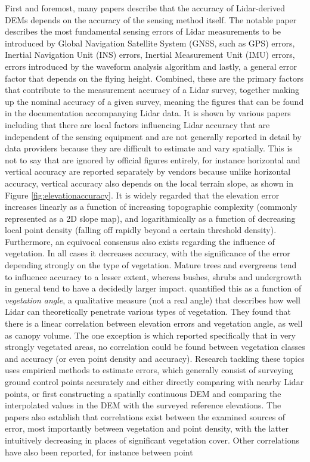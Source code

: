First and foremost, many papers describe that the accuracy of Lidar-derived DEMs depends on the accuracy of the sensing method itself. The notable paper \cite{hodgson_breshanan_2004} describes the most fundamental sensing errors of Lidar measurements to be introduced by Global Navigation Satellite System (GNSS, such as GPS) errors, Inertial Navigation Unit (INS) errors, Inertial Measurement Unit (IMU) errors, errors introduced by the waveform analysis algorithm and lastly, a general error factor that depends on the flying height. Combined, these are the primary factors that contribute to the measurement accuracy of a Lidar survey, together making up the nominal accuracy of a given survey, meaning the figures that can be found in the documentation accompanying Lidar data. It is shown by various papers including \cite{hodgson_breshanan_2004, su_bork_2006, kraus_etal_2006, raber_etal_2007, peng_shih_2006, chow_hodgson_2009, aguilar_etal_2005, aguilar_etal_2010, guo_etal_2010} that there are local factors influencing Lidar accuracy that are independent of the sensing equipment and are not generally reported in detail by data providers because they are difficult to estimate and vary spatially. This is not to say that are ignored by official figures entirely, for instance horizontal and vertical accuracy are reported separately by vendors because unlike horizontal accuracy, vertical accuracy also depends on the local terrain slope, as shown in Figure \ref{fig:elevationaccuracy}. It is widely regarded that the elevation error increases linearly as a function of increasing topographic complexity (commonly represented as a 2D slope map), and logarithmically as a function of decreasing local point density (falling off rapidly beyond a certain threshold density). Furthermore, an equivocal consensus also exists regarding the influence of vegetation. In all cases it decreases accuracy, with the significance of the error depending strongly on the type of vegetation. Mature trees and evergreens tend to influence accuracy to a lesser extent, whereas bushes, shrubs and undergrowth in general tend to have a decidedly larger impact. \cite{peng_shih_2006} quantified this as a function of \textit{vegetation angle}, a qualitative measure (not a real angle) that describes how well Lidar can theoretically penetrate various types of vegetation. They found that there is a linear correlation between elevation errors and vegetation angle, as well as canopy volume. The one exception is \cite{raber_etal_2007} which reported specifically that in very strongly vegetated areas, no correlation could be found between vegetation classes and accuracy (or even point density and accuracy). Research tackling these topics uses empirical methods to estimate errors, which generally consist of surveying ground control points accurately and either directly comparing with nearby Lidar points, or first constructing a spatially continuous DEM and comparing the interpolated values in the DEM with the surveyed reference elevations. The papers also establish that correlations exist between the examined sources of error, most importantly between vegetation and point density, with the latter intuitively decreasing in places of significant vegetation cover. Other correlations have also been reported, for instance between point 